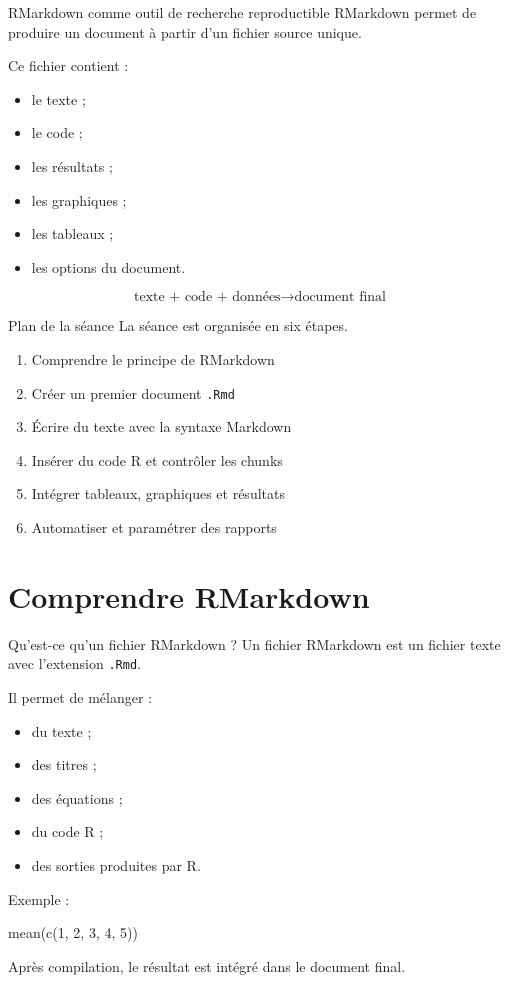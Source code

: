 \documentclass[
  10pt,
  ignorenonframetext,
]{beamer}
\providecommand{\tightlist}{%
  \setlength{\itemsep}{0pt}\setlength{\parskip}{0pt}}
\begin{document}
\begin{frame}{RMarkdown comme outil de recherche reproductible}
\label{rmarkdown-comme-outil-de-recherche-reproductible}
RMarkdown permet de produire un document à partir d'un fichier source
unique.

Ce fichier contient :

\begin{itemize}
\tightlist
\item
  le texte ;
\item
  le code ;
\item
  les résultats ;
\item
  les graphiques ;
\item
  les tableaux ;
\item
  les options du document.
\end{itemize}

\[
\text{texte + code + données}
\rightarrow
\text{document final}
\]
\end{frame}

\begin{frame}[fragile]{Plan de la séance}
\label{plan-de-la-suxe9ance}
La séance est organisée en six étapes.

\begin{enumerate}
\tightlist
\item
  Comprendre le principe de RMarkdown
\item
  Créer un premier document \texttt{.Rmd}
\item
  Écrire du texte avec la syntaxe Markdown
\item
  Insérer du code R et contrôler les chunks
\item
  Intégrer tableaux, graphiques et résultats
\item
  Automatiser et paramétrer des rapports
\end{enumerate}
\end{frame}

\section{Comprendre RMarkdown}\label{comprendre-rmarkdown}

\begin{frame}[fragile]{Qu'est-ce qu'un fichier RMarkdown ?}
\label{quest-ce-quun-fichier-rmarkdown}
Un fichier RMarkdown est un fichier texte avec l'extension
\texttt{.Rmd}.

Il permet de mélanger :

\begin{itemize}
\tightlist
\item
  du texte ;
\item
  des titres ;
\item
  des équations ;
\item
  du code R ;
\item
  des sorties produites par R.
\end{itemize}

Exemple :

mean(c(1, 2, 3, 4, 5))

Après compilation, le résultat est intégré dans le document final.
\end{frame}
\end{document}
